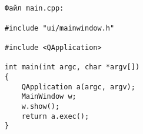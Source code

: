 \footnotesize








\begin{verbatim}


Файл main.cpp:

#include "ui/mainwindow.h"

#include <QApplication>

int main(int argc, char *argv[])
{
    QApplication a(argc, argv);
    MainWindow w;
    w.show();
    return a.exec();
}
\end{verbatim}

\normalsize